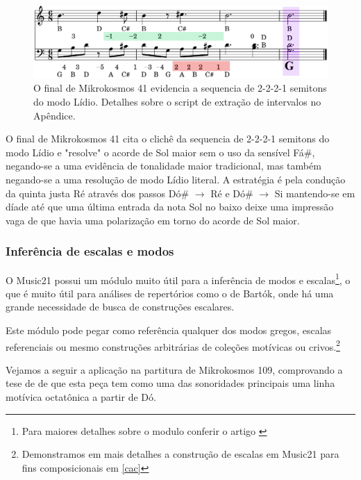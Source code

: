\documentclass[
	12pt,				%
	openright,			%
	twoside,			%
	a4paper,			%
	english,			%
	french,				%
	spanish,			%
	brazil				%
	]{abntex2}
\begin{document}
\begin{figure}[!h]
	\caption{\label{fig_grafico}O final de Mikrokosmos 41 evidencia a sequencia de 2-2-2-1 semitons do modo Lídio. Detalhes sobre o script de extração de intervalos no Apêndice. } 
	\begin{center}
	    \includegraphics[scale=0.3]{estudosM21/mikro041FinalChords_contorno.png}
	\end{center}
\end{figure}

O final de Mikrokosmos 41 cita o clichê da sequencia de 2-2-2-1 semitons do modo Lídio e "resolve" o acorde de Sol maior sem o uso da sensível Fá\#, negando-se a uma evidência de tonalidade maior tradicional, mas também negando-se a uma resolução de modo Lídio literal. A estratégia é pela condução da quinta justa Ré através dos passos Dó\# $\rightarrow $ Ré e Dó\# $\rightarrow $ Si mantendo-se em díade até que uma última entrada da nota Sol no baixo deixe uma impressão vaga de que havia uma polarização em torno do acorde de Sol maior. 

\subsubsection{Inferência de escalas e modos}

O Music21 possui um módulo muito útil para a inferência de modos e escalas\footnote{Para maiores detalhes sobre o modulo conferir o artigo \cite{ariza2011analytical}}, o que é muito útil para análises de repertórios como o de Bartók, onde há uma grande necessidade de busca de construções escalares.

Este módulo pode pegar como referência qualquer dos modos gregos, escalas referenciais ou mesmo construções arbitrárias de coleções motívicas ou crivos.\footnote{Demonstramos em mais detalhes a construção de escalas em Music21 para fins composicionais em \autoref{cac} }

Vejamos a seguir a aplicação na partitura de Mikrokosmos 109, comprovando a tese de  de que esta peça tem como uma das sonoridades principais uma linha motívica octatônica a partir de Dó.
\end{document}

